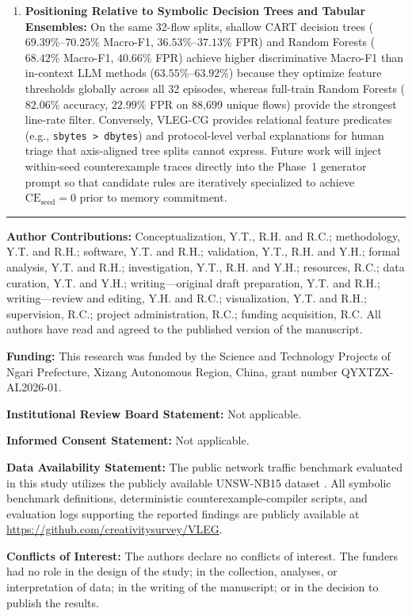\documentclass[10pt,a4paper,onecolumn]{article}
\theoremstyle{definition}
\theoremstyle{remark}
\begin{document}
\begin{enumerate}[leftmargin=1.8em]
    \item \textbf{Positioning Relative to Symbolic Decision Trees and Tabular Ensembles:} On the same 32-flow splits, shallow CART decision trees ($69.39\%$--$70.25\%$ Macro-F1, $36.53\%$--$37.13\%$ FPR) and Random Forests ($68.42\%$ Macro-F1, $40.66\%$ FPR) achieve higher discriminative Macro-F1 than in-context LLM methods ($63.55\%$--$63.92\%$) because they optimize feature thresholds globally across all 32 episodes, whereas full-train Random Forests ($82.06\%$ accuracy, $22.99\%$ FPR on 88,699 unique flows) provide the strongest line-rate filter. Conversely, VLEG-CG provides relational feature predicates (e.g., \texttt{sbytes > dbytes}) and protocol-level verbal explanations for human triage that axis-aligned tree splits cannot express. Future work will inject within-seed counterexample traces directly into the Phase~1 generator prompt so that candidate rules are iteratively specialized to achieve $\mathrm{CE}_{\mathrm{seed}}=0$ prior to memory commitment.
\end{enumerate}

\vspace{1.0em}
\hrule
\vspace{0.6em}
{\small
\noindent\textbf{Author Contributions:} Conceptualization, Y.T., R.H. and R.C.; methodology, Y.T. and R.H.; software, Y.T. and R.H.; validation, Y.T., R.H. and Y.H.; formal analysis, Y.T. and R.H.; investigation, Y.T., R.H. and Y.H.; resources, R.C.; data curation, Y.T. and Y.H.; writing---original draft preparation, Y.T. and R.H.; writing---review and editing, Y.H. and R.C.; visualization, Y.T. and R.H.; supervision, R.C.; project administration, R.C.; funding acquisition, R.C. All authors have read and agreed to the published version of the manuscript.\par\vspace{0.4em}
\noindent\textbf{Funding:} This research was funded by the Science and Technology Projects of Ngari Prefecture, Xizang Autonomous Region, China, grant number QYXTZX-AL2026-01.\par\vspace{0.4em}
\noindent\textbf{Institutional Review Board Statement:} Not applicable.\par\vspace{0.4em}
\noindent\textbf{Informed Consent Statement:} Not applicable.\par\vspace{0.4em}
\noindent\textbf{Data Availability Statement:} The public network traffic benchmark evaluated in this study utilizes the publicly available UNSW-NB15 dataset \cite{moustafa2015unsw}. All symbolic benchmark definitions, deterministic counterexample-compiler scripts, and evaluation logs supporting the reported findings are publicly available at \url{https://github.com/creativitysurvey/VLEG}.\par\vspace{0.4em}
\noindent\textbf{Conflicts of Interest:} The authors declare no conflicts of interest. The funders had no role in the design of the study; in the collection, analyses, or interpretation of data; in the writing of the manuscript; or in the decision to publish the results.
}
\end{document}
